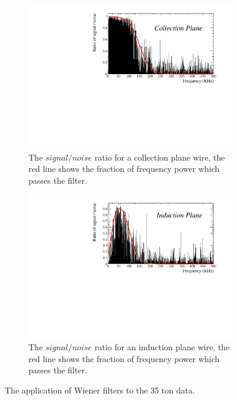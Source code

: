 \begin{figure}[h!]
\begin{subfigure}{0.45\textwidth}
    \centering
    \includegraphics[width=\textwidth]{Collection}
    \caption{The $signal/noise$ ratio for a collection plane wire, the red line shows the fraction of frequency power which passes the filter.}
    \label{fig:FreqCollection}
  \end{subfigure}
  \hspace{0.08\textwidth}
  \begin{subfigure}{0.45\textwidth}
    \centering
    \includegraphics[width=\textwidth]{Induction}
    \caption{The $signal/noise$ ratio for an induction plane wire, the red line shows the fraction of frequency power which passes the filter.}
    \label{fig:FreqInduction}
  \end{subfigure}
  \caption[Applying Wiener filters to the 35 ton data]{The application of Wiener filters to the 35 ton data.}
  \label{fig:FrequencyFilter}
\end{figure}

